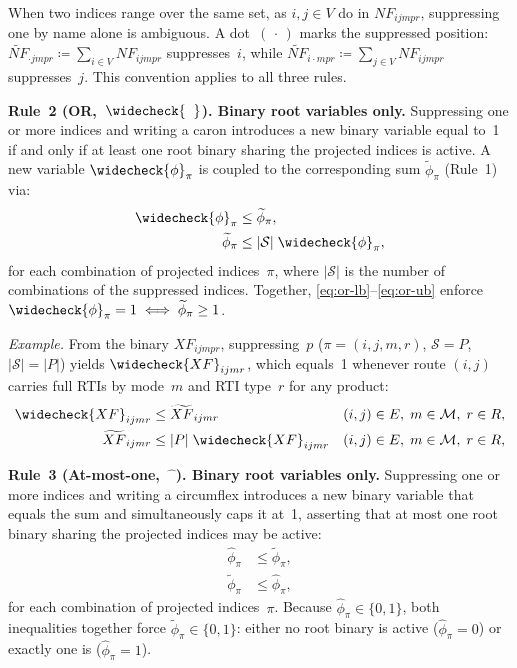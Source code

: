 \begin{convention}
When two indices range over the same set, as $i,j\in V$ do in
$NF_{ijmpr}$, suppressing one by name alone is ambiguous.
A dot~$(\,\cdot\,)$ marks the suppressed position:
$\widetilde{NF}_{\cdot jmpr}\coloneqq\sum_{i\in V}NF_{ijmpr}$
suppresses~$i$, while
$\widetilde{NF}_{i\cdot mpr}\coloneqq\sum_{j\in V}NF_{ijmpr}$
suppresses~$j$. This convention applies to all three rules.


\medskip
\noindent\textbf{Rule~2
  \textnormal{(OR,~$\widecheck{\phantom{x}}$).}
  Binary root variables only.}
Suppressing one or more indices and writing a caron introduces a new
binary variable equal to~1 if and only if at least one root
binary sharing the projected indices is active. A new variable
$\widecheck{\phi}_{\pi}$ is coupled to the corresponding sum
$\widetilde{\phi}_{\pi}$ (Rule~1) via:
\begin{align}
  \widecheck{\phi}_{\pi}
    &\leq \widetilde{\phi}_{\pi},
    \label{eq:or-lb} \\
  \widetilde{\phi}_{\pi}
    &\leq |\mathcal{S}|\;\widecheck{\phi}_{\pi},
    \label{eq:or-ub}
\end{align}
for each combination of projected indices~$\pi$, where $|\mathcal{S}|$
is the number of combinations of the suppressed indices. Together,
\eqref{eq:or-lb}--\eqref{eq:or-ub} enforce
$\widecheck{\phi}_{\pi}=1 \iff \widetilde{\phi}_{\pi}\geq 1$.

\smallskip\noindent\textit{Example.}
From the binary $XF_{ijmpr}$, suppressing~$p$
($\pi=(i,j,m,r)$, $\mathcal{S}=P$, $|\mathcal{S}|=|P|$)
yields $\widecheck{XF}_{ijmr}$, which equals~1 whenever route
$(i,j)$ carries full RTIs by mode~$m$ and RTI type~$r$ for any
product:
\begin{align}
  \widecheck{XF}_{ijmr}
    &\leq \widetilde{XF}_{ijmr}
    && (i,j)\in E,\;m\in\mathcal{M},\;r\in R,
    \label{eq:or-ex-lb} \\
  \widetilde{XF}_{ijmr}
    &\leq |P|\;\widecheck{XF}_{ijmr}
    && (i,j)\in E,\;m\in\mathcal{M},\;r\in R,
    \label{eq:or-ex-ub}
\end{align}

\medskip
\noindent\textbf{Rule~3
  \textnormal{(At-most-one,~$\widehat{\phantom{x}}$).}
  Binary root variables only.}
Suppressing one or more indices and writing a circumflex introduces a
new binary variable that equals the sum and simultaneously caps it
at~1, asserting that at most one root binary sharing the
projected indices may be active:
\begin{align}
  \widehat{\phi}_{\pi}
    &\leq \widetilde{\phi}_{\pi},
    \label{eq:amo-lb} \\
  \widetilde{\phi}_{\pi}
    &\leq \widehat{\phi}_{\pi},
    \label{eq:amo-ub}
\end{align}
for each combination of projected indices~$\pi$. Because
$\widehat{\phi}_{\pi}\in\{0,1\}$, both inequalities together force
$\widetilde{\phi}_{\pi}\in\{0,1\}$: either no root binary is active
($\widehat{\phi}_{\pi}=0$) or exactly one is
($\widehat{\phi}_{\pi}=1$).


\end{convention}
